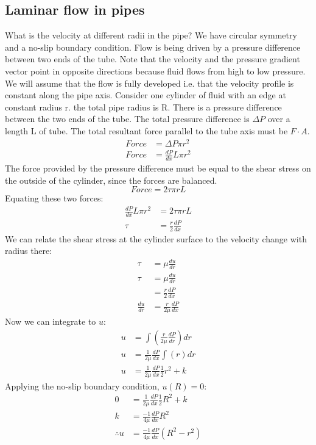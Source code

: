 \documentclass[class=report, crop=false, 12pt,a4paper]{standalone}
\begin{document}
\subsection{Laminar flow in pipes}
What is the velocity at different radii in the pipe? We have circular symmetry and a no-slip boundary condition. Flow is being driven by a pressure difference between two ends of the tube. Note that the velocity and the pressure gradient vector point in opposite directions because fluid flows from high to low pressure. We will assume that the flow is fully developed i.e. that the velocity profile is constant along the pipe axis. Consider one cylinder of fluid with an edge at constant radius r. the total pipe radius is R. There is a pressure difference between the two ends of the tube. The total pressure difference is \(\Delta P\) over a length L of tube. The total resultant force parallel to the tube axis must be \(F\cdot A\).
\begin{align}
  Force &= \Delta P \pi r^2\\
  Force &= \frac{dP}{dx}L\pi r^2
\end{align}
The force provided by the pressure difference must be equal to the shear stress on the outside of the cylinder, since the forces are balanced.
\begin{equation} 
  Force = 2\tau \pi r L 
\end{equation}
Equating these two forces:
\begin{align}
  \frac{dP}{dx}L\pi r^2 &= 2\tau \pi r L\\
  \tau &= \frac{r}{2} \frac{dP}{dx}
\end{align}
We can relate the shear stress at the cylinder surface to the velocity change with radius there:
\begin{align}
  \tau &= \mu \frac{du}{dr}\\
  \tau &= \mu \frac{du}{dr}\\
  &= \frac{r}{2} \frac{dP}{dx}\\
  \frac{du}{dr} &= \frac{r}{2\mu} \frac{dP}{dx}
\end{align}
Now we can integrate to \(u\):
\begin{align}
  u &= \int \left( \frac{r}{2\mu} \frac{dP}{dr} \right) dr\\
  u &= \frac{1}{2\mu} \frac{dP}{dx} \int (r) dr\\
  u &= \frac{1}{2\mu} \frac{dP}{dx} \frac{1}{2}r^2 +k
\end{align}
Applying the no-slip boundary condition, \( u(R) = 0\):
\begin{align}
  0 &= \frac{1}{2\mu} \frac{dP}{dx} \frac{1}{2} R^2 + k\\
  k &= \frac{-1}{4\mu} \frac{dP}{dx} R^2 \\
  \therefore u &= \frac{-1}{4\mu}\frac{dP}{dx}(R^2 - r^2)
\end{align}
\end{document}
